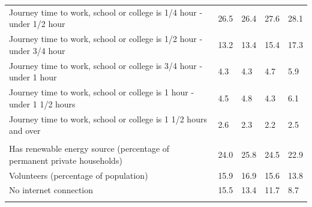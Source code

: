 \documentclass{article}
\begin{document}
\begin{table}[h]
\begin{tabular}{KTTTT}
Journey time to work, school or college is 1/4 hour - under 1/2 hour & 26.5& 26.4& 27.6& 28.1\\
Journey time to work, school or college is 1/2 hour - under 3/4 hour & 13.2& 13.4& 15.4& 17.3\\
Journey time to work, school or college is 3/4 hour - under 1 hour & 4.3& 4.3& 4.7& 5.9\\
Journey time to work, school or college is 1 hour - under 1 1/2 hours & 4.5& 4.8& 4.3& 6.1\\
Journey time to work, school or college is 1 1/2 hours and over & 2.6& 2.3& 2.2& 2.5\\
\hline
    \\ 
    \hline
Has renewable energy source (percentage of permanent private households) & 24.0& 25.8& 24.5& 22.9\\
    \hline
Volunteers (percentage of population) & 15.9& 16.9& 15.6& 13.8\\
    \hline
No internet connection& 15.5& 13.4& 11.7&  8.7\\
\hline
\end{tabular}
\end{table}
\end{document}
